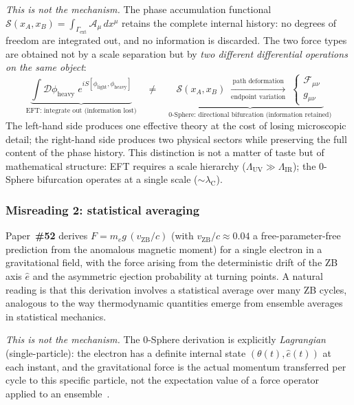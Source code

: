 \documentclass[12pt,letterpaper]{article}
\newcommand{\paperno}[1]{\textbf{\#{}#1}}
\newcommand{\vZB}{v_{\mathrm{ZB}}}
\newcommand{\lambdaC}{\lambda_{\mathrm{C}}}
\newcommand{\calS}{\mathcal{S}}
\newcommand{\calA}{\mathcal{A}}
\newcommand{\iphase}{\theta}
\begin{document}
\emph{This is not the mechanism.}
The phase accumulation functional $\calS(x_A,x_B) = \int_{\Gamma_{\mathrm{ext}}}\calA_\mu\,dx^\mu$
retains the complete internal history: no degrees of freedom are integrated out,
and no information is discarded.
The two force types are obtained not by a scale separation but by
\emph{two different differential operations on the same object}:
\begin{equation}
\underbrace{\int\!\mathcal{D}\phi_{\mathrm{heavy}}\;e^{iS[\phi_{\mathrm{light}},\phi_{\mathrm{heavy}}]}}_{\text{EFT: integrate out (information lost)}}
\quad\neq\quad
\underbrace{\calS(x_A,x_B)
\;\xrightarrow[\text{endpoint variation}]{\text{path deformation}}\;
\begin{cases}
\mathcal{F}_{\mu\nu}\\[2pt]
g_{\mu\nu}
\end{cases}}_{\text{0-Sphere: directional bifurcation (information retained)}}
\label{eq:eft_vs_0sm}
\end{equation}
The left-hand side produces one effective theory at the cost of losing
microscopic detail; the right-hand side produces two physical sectors
while preserving the full content of the phase history.
This distinction is not a matter of taste but of mathematical structure:
EFT requires a scale hierarchy ($\Lambda_{\mathrm{UV}}\gg\Lambda_{\mathrm{IR}}$);
the 0-Sphere bifurcation operates at a single scale ($\sim\lambdaC$).

\subsubsection{Misreading 2: statistical averaging}

Paper~\paperno{52} derives $F = m_e g\,(\vZB/c)$ (with $\vZB/c\approx 0.04$ a
free-parameter-free prediction from the anomalous magnetic moment) for a single electron
in a gravitational field, with the force arising from the deterministic drift of the ZB axis
$\hat{e}$ and the asymmetric ejection probability at turning points.
A natural reading is that this derivation involves a statistical average
over many ZB cycles, analogous to the way thermodynamic quantities
emerge from ensemble averages in statistical mechanics.

\emph{This is not the mechanism.}
The 0-Sphere derivation is explicitly \emph{Lagrangian} (single-particle):
the electron has a definite internal state $(\iphase(t), \hat{e}(t))$ at
each instant, and the gravitational force is the actual momentum transferred
per cycle to this specific particle, not the expectation value of a force
operator applied to an ensemble~\cite{hanamura52}.
\end{document}
